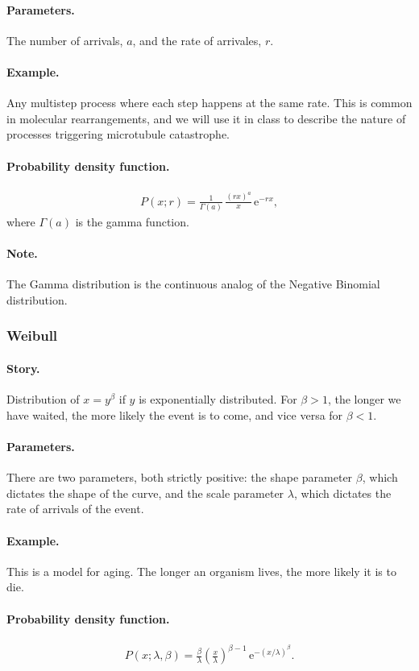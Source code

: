 \paragraph{Parameters.} The number of arrivals, $a$, and the rate of
arrivales, $r$.
\paragraph{Example.} Any multistep process where each step happens at
the same rate.  This is common in molecular rearrangements, and we
will use it in class to describe the nature of processes triggering
microtubule catastrophe.
\paragraph{Probability density function.}
\begin{align}
P(x;r) = \frac{1}{\Gamma(a)}\,\frac{(rx)^a}{x}\,\mathrm{e}^{-rx},
\end{align}
where $\Gamma(a)$ is the gamma function.
\paragraph{Note.} The Gamma distribution is the continuous
analog of the Negative Binomial distribution.



\subsubsection{Weibull}
\paragraph{Story.} Distribution of $x = y^\beta$ if $y$ is
exponentially distributed.  For $\beta > 1$, the longer we have
waited, the more likely the event is to come, and vice versa for
$\beta < 1$.
\paragraph{Parameters.} There are two parameters, both strictly
positive: the shape parameter $\beta$, which dictates the shape of the
curve, and the scale parameter $\lambda$, which dictates the rate of
arrivals of the event.
\paragraph{Example.} This is a model for aging.  The longer an
organism lives, the more likely it is to die.
\paragraph{Probability density function.}
\begin{align}
P(x;\lambda, \beta) = \frac{\beta}{\lambda}\left(\frac{x}{\lambda}\right)^{\beta - 1}\,
\mathrm{e}^{-(x/\lambda)^\beta}.
\end{align}


